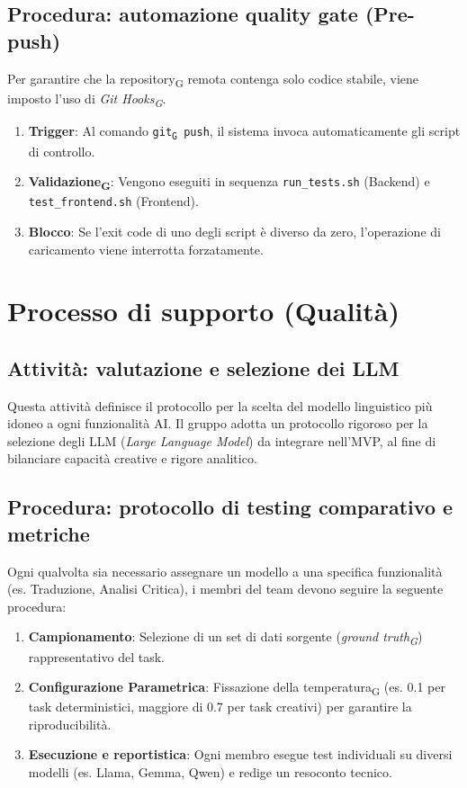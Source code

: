 \documentclass[11pt,a4paper]{article}
\newcommand{\gls}[1]{#1\textsubscript{G}}
\begin{document}
\subsection{Procedura: automazione quality gate (Pre-push)}
Per garantire che la \gls{repository} remota contenga solo codice stabile, viene imposto l'uso di \textit{\gls{Git Hooks}}.
\begin{enumerate}
    \item \textbf{Trigger}: Al comando \texttt{\gls{git} push}, il sistema invoca automaticamente gli script di controllo.
    \item \textbf{\gls{Validazione}}: Vengono eseguiti in sequenza \texttt{run\_tests.sh} (Backend) e \texttt{test\_frontend.sh} (Frontend).
    \item \textbf{Blocco}: Se l'exit code di uno degli script è diverso da zero, l'operazione di caricamento viene interrotta forzatamente.
\end{enumerate}

\newpage

\section{Processo di supporto (Qualità)}
\subsection{Attività: valutazione e selezione dei LLM}
Questa attività definisce il protocollo per la scelta del modello linguistico più idoneo a ogni funzionalità AI. Il gruppo adotta un protocollo rigoroso per la selezione degli LLM (\textit{Large Language Model}) da integrare nell'MVP, al fine di bilanciare capacità creative e rigore analitico.

\subsection{Procedura: protocollo di testing comparativo e metriche}
Ogni qualvolta sia necessario assegnare un modello a una specifica funzionalità (es. Traduzione, Analisi Critica), i membri del team devono seguire la seguente procedura:
\begin{enumerate}
    \item \textbf{Campionamento}: Selezione di un set di dati sorgente (\textit{\gls{ground truth}}) rappresentativo del task.
    \item \textbf{Configurazione Parametrica}: Fissazione della \gls{temperatura} (es. 0.1 per task deterministici, maggiore di 0.7 per task creativi) per garantire la riproducibilità.
    \item \textbf{Esecuzione e reportistica}: Ogni membro esegue test individuali su diversi modelli (es. Llama, Gemma, Qwen) e redige un resoconto tecnico.
\end{enumerate}
\end{document}
